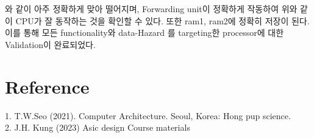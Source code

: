 \documentclass[oneside]{article}
\begin{document}
와 같이 아주 정확하게 맞아 떨어지며, Forwarding unit이 정확하게 작동하여 위와 같이 CPU가 잘 동작하는 것을 확인할 수 있다.  또한 ram1, ram2에 정확히 저장이 된다. 이를 통해 모든 functionality와 data-Hazard 를 targeting한 processor에 대한 Validation이 완료되었다.

\section{Reference}
1. T.W.Seo (2021). Computer Architecture. Seoul, Korea: Hong pup science. \\
2. J.H. Kung (2023) Asic design Course materials
\end{document}
